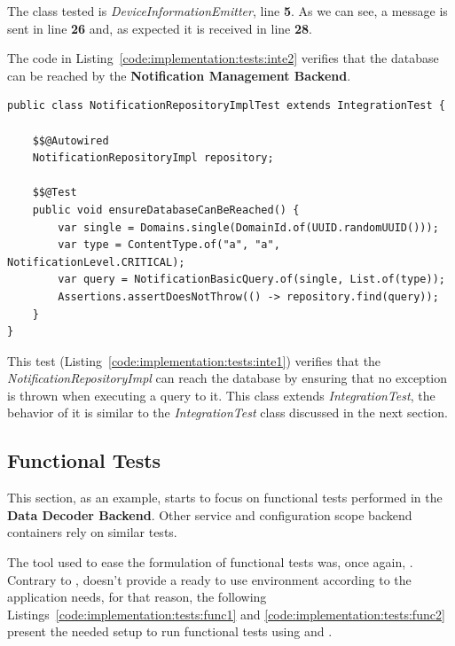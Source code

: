 The class tested is \textit{DeviceInformationEmitter}, line \textbf{5}. As we can see, a message is sent in line \textbf{26} and, as expected it is received in line \textbf{28}.

The code in Listing~\ref{code:implementation:tests:inte2} verifies that the database can be reached by the \textbf{Notification Management Backend}.

\begin{lstlisting}[style=Java, caption=Integration Test - Database - Notification Management Backend, label={code:implementation:tests:inte2}]
public class NotificationRepositoryImplTest extends IntegrationTest {

    $$@Autowired
    NotificationRepositoryImpl repository;

    $$@Test
    public void ensureDatabaseCanBeReached() {
        var single = Domains.single(DomainId.of(UUID.randomUUID()));
        var type = ContentType.of("a", "a", NotificationLevel.CRITICAL);
        var query = NotificationBasicQuery.of(single, List.of(type));
        Assertions.assertDoesNotThrow(() -> repository.find(query));
    }
}
\end{lstlisting}

This test (Listing~\ref{code:implementation:tests:inte1}) verifies that the \textit{NotificationRepositoryImpl} can reach the database by ensuring that no exception is thrown when executing a query to it. This class extends \textit{IntegrationTest}, the behavior of it is similar to the \textit{IntegrationTest} class discussed in the next section.

\subsection{Functional Tests}
\label{subsec:implementation:tests:functional}

This section, as an example, starts to focus on functional tests performed in the \textbf{Data Decoder Backend}. Other service and configuration scope backend containers rely on similar tests.

The tool used to ease the formulation of functional tests was, once again, . Contrary to ,  doesn't provide a ready to use environment according to the application needs, for that reason, the following Listings~\ref{code:implementation:tests:func1} and \ref{code:implementation:tests:func2} present the needed setup to run functional tests using  and .

